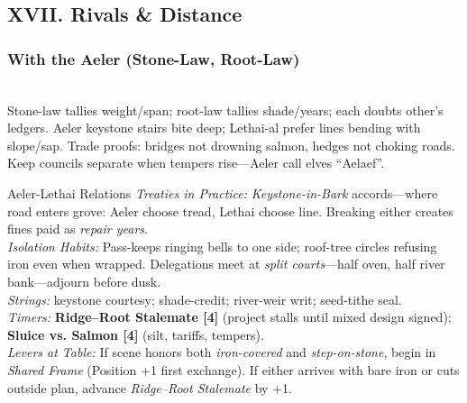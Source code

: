 \documentclass[11pt]{book}
\begin{document}
\subsection{XVII. Rivals \& Distance}
\subsubsection*{With the Aeler (Stone-Law, Root-Law)} \\
Stone-law tallies weight/span; root-law tallies shade/years; each doubts other's ledgers. Aeler keystone stairs bite deep; Lethai-al prefer lines bending with slope/sap. Trade proofs: bridges not drowning salmon, hedges not choking roads. Keep councils separate when tempers rise---Aeler call elves ``Aelaef''.
\begin{atTheTable}{Aeler-Lethai Relations}
\textit{Treaties in Practice:} \emph{Keystone-in-Bark} accords---where road enters grove: Aeler choose tread, Lethai choose line. Breaking either creates fines paid as \emph{repair years}. \\
\textit{Isolation Habits:} Pass-keeps ringing bells to one side; roof-tree circles refusing iron even when wrapped. Delegations meet at \emph{split courts}---half oven, half river bank---adjourn before dusk. \\
\textit{Strings:} keystone courtesy; shade-credit; river-weir writ; seed-tithe seal. \\
\textit{Timers:} \textbf{Ridge--Root Stalemate [4]} (project stalls until mixed design signed); \textbf{Sluice vs. Salmon [4]} (silt, tariffs, tempers). \\
\textit{Levers at Table:} If scene honors both \emph{iron-covered} and \emph{step-on-stone}, begin in \emph{Shared Frame} (Position +1 first exchange). If either arrives with bare iron or cuts outside plan, advance \emph{Ridge--Root Stalemate} by +1.
\end{atTheTable}
\end{document}
